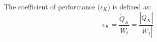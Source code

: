 The coefficient of performance (\( \epsilon_K \)) is defined as:  
\[
\epsilon_K = \frac{\dot{Q}_K}{\dot{W}_t} = \frac{\left| \dot{Q}_K \right|}{\left| \dot{W}_t \right|}
\]